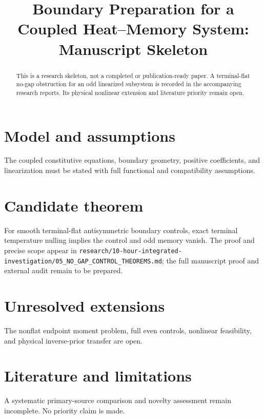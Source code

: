 \documentclass{article}
\title{Boundary Preparation for a Coupled Heat--Memory System: Manuscript Skeleton}
\date{}
\begin{document}
\maketitle
\begin{abstract}This is a research skeleton, not a completed or publication-ready paper. A terminal-flat no-gap obstruction for an odd linearized subsystem is recorded in the accompanying research reports. Its physical nonlinear extension and literature priority remain open.\end{abstract}
\section{Model and assumptions} The coupled constitutive equations, boundary geometry, positive coefficients, and linearization must be stated with full functional and compatibility assumptions.
\section{Candidate theorem} For smooth terminal-flat antisymmetric boundary controls, exact terminal temperature nulling implies the control and odd memory vanish. The proof and precise scope appear in \texttt{research/10-hour-integrated-investigation/05\_NO\_GAP\_CONTROL\_THEOREMS.md}; the full manuscript proof and external audit remain to be prepared.
\section{Unresolved extensions} The nonflat endpoint moment problem, full even controls, nonlinear feasibility, and physical inverse-prior transfer are open.
\section{Literature and limitations} A systematic primary-source comparison and novelty assessment remain incomplete. No priority claim is made.
\end{document}
